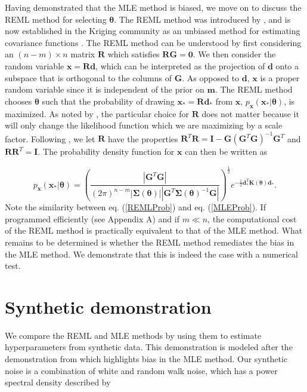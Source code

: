 \documentclass[10pt,a4paper]{article}
\begin{document}
Having demonstrated that the MLE method is biased, we move on to discuss the REML method for selecting $\mathbf{\theta}$.  The REML method was introduced by \citet{Patterson1971}, and is now established in the Kriging community as an unbiased method for estimating covariance functions \citep[e.g.,][]{Cressie1992}. The REML method can be understood by first considering an $(n-m)\times n$ matrix $\mathbf{R}$ which satisfies $\mathbf{R}\mathbf{G}=\mathbf{0}$.  We then consider the random variable $\mathbf{x}=\mathbf{R}\mathbf{d}$, which can be interpreted as the projection of $\mathbf{d}$ onto a subspace that is orthogonal to the columns of $\mathbf{G}$. As opposed to $\mathbf{d}$, $\mathbf{x}$ is a proper random variable since it is independent of the prior on $\mathbf{m}$. The REML method chooses $\mathbf{\theta}$ such that the probability of drawing $\mathbf{x}_*=\mathbf{R}\mathbf{d}_*$ from $\mathbf{x}$, $p_\mathbf{x}(\mathbf{x}_*|\mathbf{\theta})$, is maximized. As noted by \citet{Harville1974}, the particular choice for $\mathbf{R}$ does not matter because it will only change the likelihood function which we are maximizing by a scale factor. Following \citet{Harville1974}, we let $\mathbf{R}$ have the properties $\mathbf{R}^T\mathbf{R} = \mathbf{I} - \mathbf{G}(\mathbf{G}^T\mathbf{G})^{-1}\mathbf{G}^T$ and $\mathbf{R}\mathbf{R}^T = \mathbf{I}$. The probability density function for $\mathbf{x}$ can then be written as 

\begin{equation}\label{REMLProb}
p_\mathbf{x}(\mathbf{x}_*|\mathbf{\theta}) =
\left(\frac{\left|\mathbf{G}^T\mathbf{G}\right|}
           {(2\pi)^{n-m}
            \left| \mathbf{\Sigma}(\mathbf{\theta}) \right| 
            \left| \mathbf{G}^T\mathbf{\Sigma}(\mathbf{\theta})^{-1}\mathbf{G} \right|}\right)^{\frac{1}{2}} 
e^{-\tfrac{1}{2}\mathbf{d}_*^T\mathbf{K}(\mathbf{\theta})\mathbf{d}_*} .
\end{equation}
Note the similarity between eq. (\ref{REMLProb}) and eq. (\ref{MLEProb}). If programmed efficiently (see Appendix A) and if $m \ll n$, the computational cost of the REML method is practically equivalent to that of the MLE method. What remains to be determined is whether the REML method remediates the bias in the MLE method. We demonstrate that this is indeed the case with a numerical test. 

\section{Synthetic demonstration}
We compare the REML and MLE methods by using them to estimate hyperparameters from synthetic data. This demonstration is modeled after the demonstration from \citet{Langbein2012} which highlights bias in the MLE method. Our synthetic noise is a combination of white and random walk noise, which has a power spectral density described by
\end{document}
